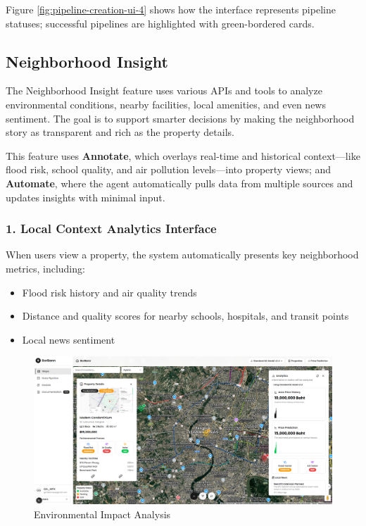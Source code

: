 Figure \ref{fig:pipeline-creation-ui-4} shows how the interface represents pipeline statuses; successful pipelines are highlighted with green-bordered cards.

\subsection{Neighborhood Insight}

The Neighborhood Insight feature uses various APIs and tools to analyze environmental conditions, nearby facilities, local amenities, and even news sentiment. The goal is to support smarter decisions by making the neighborhood story as transparent and rich as the property details.

This feature uses \textbf{Annotate}, which overlays real-time and historical context—like flood risk, school quality, and air pollution levels—into property views; and \textbf{Automate}, where the agent automatically pulls data from multiple sources and updates insights with minimal input.

\subsubsection*{1. Local Context Analytics Interface}

When users view a property, the system automatically presents key neighborhood metrics, including:

\begin{itemize}
	\item Flood risk history and air quality trends
	\item Distance and quality scores for nearby schools, hospitals, and transit points
	\item Local news sentiment
\end{itemize}

\begin{figure}[htbp]
	\centering
	\includegraphics[width=1\textwidth]{assets/ai/insight-1.png}
	\caption{Environmental Impact Analysis}
	\label{fig:insight-ui-1}
\end{figure}


